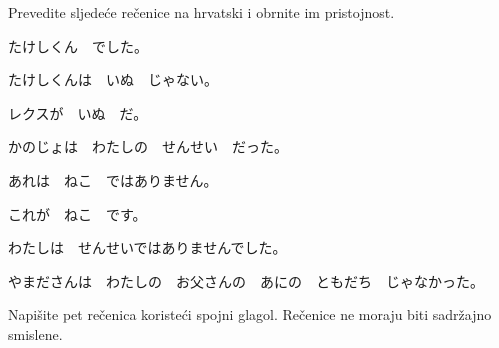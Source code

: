 
\author{Ivan Petranović}

	
	\begin{mondai}{Prevedite sljedeće rečenice na hrvatski i obrnite im pristojnost.}
		\item たけしくん　でした。
		\item たけしくんは　いぬ　じゃない。
		\item レクスが　いぬ　だ。
		\item かのじょは　わたしの　せんせい　だった。
		\item あれは　ねこ　ではありません。
		\item これが　ねこ　です。
		\item わたしは　せんせいではありませんでした。
		\item やまださんは　わたしの　お父さんの　あにの　ともだち　じゃなかった。
	\end{mondai}

	Napišite pet rečenica koristeći spojni glagol. Rečenice ne moraju biti sadržajno smislene.

